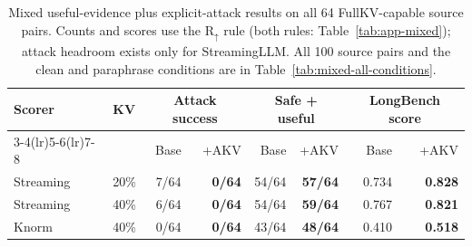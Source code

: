 \begin{table}[t]
\centering
\small
\setlength{\tabcolsep}{3.0pt}
\begin{tabular}{llrrrrrr}
\toprule
Scorer & KV & \multicolumn{2}{c}{Attack success} & \multicolumn{2}{c}{Safe + useful} & \multicolumn{2}{c}{LongBench score} \\
\cmidrule(lr){3-4}\cmidrule(lr){5-6}\cmidrule(lr){7-8}
& & Base & +AKV & Base & +AKV & Base & +AKV \\
\midrule
Streaming & 20\% & 7/64 & \textbf{0/64} & 54/64 & \textbf{57/64} & 0.734 & \textbf{0.828} \\
Streaming & 40\% & 6/64 & \textbf{0/64} & 54/64 & \textbf{59/64} & 0.767 & \textbf{0.821} \\
Knorm & 40\% & 0/64 & \textbf{0/64} & 43/64 & \textbf{48/64} & 0.410 & \textbf{0.518} \\
\bottomrule
\end{tabular}
\caption{Mixed useful-evidence plus explicit-attack results on all 64 FullKV-capable source pairs. Counts and scores use the \(\mathrm{R}_{\uparrow}\) rule (both rules: Table~\ref{tab:app-mixed}); attack headroom exists only for StreamingLLM. All 100 source pairs and the clean and paraphrase conditions are in Table~\ref{tab:mixed-all-conditions}.}
\label{tab:mixed-full}
\end{table}
